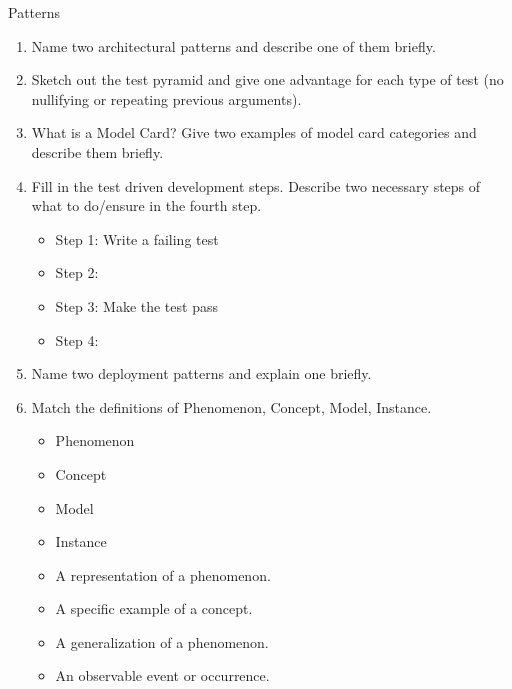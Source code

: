 \documentclass{article}
\begin{document}
\begin{exercise}{Patterns}
  \begin{enumerate}
    \item Name two architectural patterns and describe one of them briefly.
    \item Sketch out the test pyramid and give one advantage for each type of test (no nullifying or repeating previous arguments).
    \item What is a Model Card? Give two examples of model card categories and describe them briefly.
    \item Fill in the test driven development steps. Describe two necessary steps of what to do/ensure in the fourth step.
      \begin{itemize}
        \item Step 1: Write a failing test
        \item Step 2: \
        \item Step 3: Make the test pass
        \item Step 4: \
      \end{itemize}
    \item Name two deployment patterns and explain one briefly.
    \item Match the definitions of Phenomenon, Concept, Model, Instance.
      \begin{itemize}
        \item Phenomenon
        \item Concept
        \item Model
        \item Instance
      \end{itemize}
      \begin{itemize}
        \item A representation of a phenomenon.
        \item A specific example of a concept.
        \item A generalization of a phenomenon.
        \item An observable event or occurrence.
      \end{itemize}
  \end{enumerate}

  \begin{solution}
  \end{solution}
\end{exercise}
\end{document}
